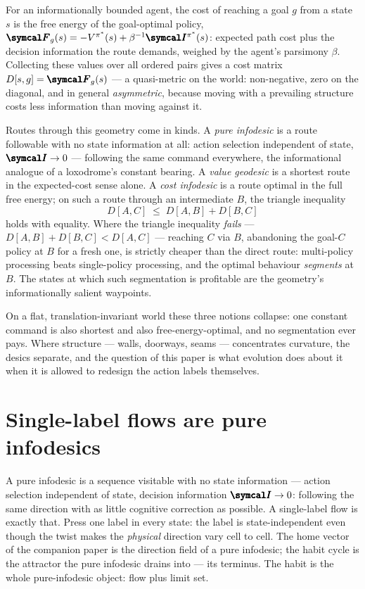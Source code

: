 \documentclass[a4paper, notitlepage, 11pt]{article}
\theoremstyle{plain}
\begin{document}

For an informationally bounded agent, the cost of reaching a goal $g$ from
a state $s$ is the free energy of the goal-optimal policy,
$\Fen_g(s) = -V^{\pi^*}(s) + \beta^{-1} \ItgD^{\pi^*}(s)$: expected path
cost plus the decision information the route demands, weighed by the
agent's parsimony $\beta$.  Collecting these values over all ordered pairs
gives a cost matrix $D[s, g] = \Fen_g(s)$ --- a quasi-metric on the world:
non-negative, zero on the diagonal, and in general \emph{asymmetric},
because moving with a prevailing structure costs less information than
moving against it.

Routes through this geometry come in kinds.  A \emph{pure infodesic} is a
route followable with no state information at all: action selection
independent of state, $\ItgD \to 0$ --- following the same command
everywhere, the informational analogue of a loxodrome's constant bearing.
A \emph{value geodesic} is a shortest route in the expected-cost sense
alone.  A \emph{cost infodesic} is a route optimal in the full free
energy; on such a route through an intermediate $B$, the triangle
inequality
\[
  D[A, C] \;\leq\; D[A, B] + D[B, C]
\]
holds with equality.  Where the triangle inequality \emph{fails} ---
$D[A, B] + D[B, C] < D[A, C]$ --- reaching $C$ via $B$, abandoning the
goal-$C$ policy at $B$ for a fresh one, is strictly cheaper than the
direct route: multi-policy processing beats single-policy processing, and
the optimal behaviour \emph{segments} at $B$.  The states at which such
segmentation is profitable are the geometry's informationally salient
waypoints.

On a flat, translation-invariant world these three notions collapse: one
constant command is also shortest and also free-energy-optimal, and no
segmentation ever pays.  Where structure --- walls, doorways, seams ---
concentrates curvature, the desics separate, and the question of this
paper is what evolution does about it when it is allowed to redesign the
action labels themselves.

\section{Single-label flows are pure infodesics}
\label{sec:pure}

A pure infodesic is a sequence visitable with no state information ---
action selection independent of state, decision information
$\ItgD \to 0$: following the same direction with as little cognitive
correction as possible.  A single-label flow is exactly that.  Press one
label in every state: the label is state-independent even though the twist
makes the \emph{physical} direction vary cell to cell.  The home vector of
the companion paper is the direction field of a pure infodesic; the habit
cycle is the attractor the pure infodesic drains into --- its terminus.
The habit is the whole pure-infodesic object: flow plus limit set.
\end{document}
